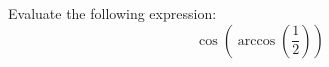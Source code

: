 \documentclass{ximera}
\author{David Kish}
\begin{document}
\begin{exercise}
Evaluate the following expression:
\[
\cos(\arccos(\frac{1}{2}))
\]
\begin{multipleChoice}
\end{multipleChoice}
\end{exercise}
\end{document}
